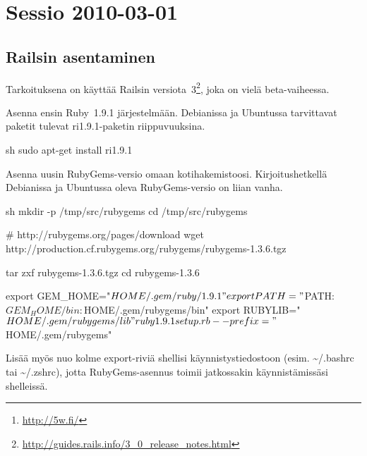 \documentclass{article}
\title{\en{5w Ruby on Rails workshop}}
\author{Johan Kiviniemi}
\begin{document}
\maketitle

\begin{abstract}
Jotain dokumentaationtynkää 5w:n\footnote{\url{http://5w.fi/}}, Tampereen
hackerspacen, Rails-opiskeluprojektista.
\end{abstract}

\tableofcontents

\section{Sessio 2010-03-01}

\subsection{Railsin asentaminen}

\begin{samepage}
Tarkoituksena on käyttää Railsin
versiota~3\footnote{\url{http://guides.rails.info/3\_0\_release\_notes.html}},
joka on vielä beta-vaiheessa.

Asenna ensin Ruby~1.9.1 järjestelmään. Debianissa ja Ubuntussa tarvittavat
paketit tulevat ri1.9.1-paketin riippuvuuksina.

\begin{pygmented}{sh}
sudo apt-get install ri1.9.1
\end{pygmented}

Asenna uusin RubyGems-versio omaan kotihakemistoosi. Kirjoitushetkellä
Debianissa ja Ubuntussa oleva RubyGems-versio on liian vanha.

\begin{pygmented}{sh}
mkdir -p /tmp/src/rubygems
cd /tmp/src/rubygems

# http://rubygems.org/pages/download
wget http://production.cf.rubygems.org/rubygems/rubygems-1.3.6.tgz

tar zxf rubygems-1.3.6.tgz
cd rubygems-1.3.6

export GEM_HOME="$HOME/.gem/ruby/1.9.1"
export PATH="$PATH:$GEM_HOME/bin:$HOME/.gem/rubygems/bin"
export RUBYLIB="$HOME/.gem/rubygems/lib"

ruby1.9.1 setup.rb --prefix="$HOME/.gem/rubygems"
\end{pygmented}
\end{samepage}

Lisää myös nuo kolme export-riviä shellisi käynnistystiedostoon (esim.
\textasciitilde/.bashrc tai \textasciitilde/.zshrc), jotta RubyGems-asennus
toimii jatkossakin käynnistämissäsi shelleissä.
\end{document}
